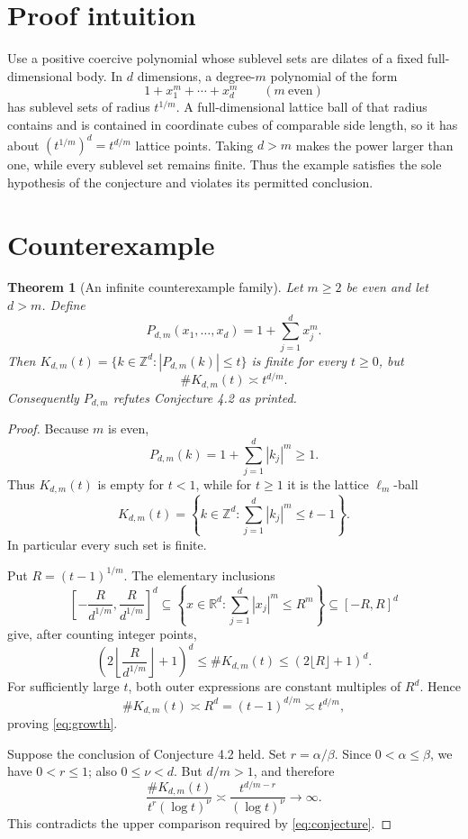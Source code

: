 \documentclass[11pt]{article}
\newtheorem{theorem}{Theorem}
\newcommand{\R}{\mathbb R}
\newcommand{\Z}{\mathbb Z}
\begin{document}
\section{Proof intuition}

Use a positive coercive polynomial whose sublevel sets are dilates of a
fixed full-dimensional body.  In $d$ dimensions, a degree-$m$ polynomial
of the form
\[
 1+x_1^m+\cdots+x_d^m\qquad(m\ \text{even})
\]
has sublevel sets of radius $t^{1/m}$.  A full-dimensional lattice ball of
that radius contains and is contained in coordinate cubes of comparable
side length, so it has about $(t^{1/m})^d=t^{d/m}$ lattice points.  Taking
$d>m$ makes the power larger than one, while every sublevel set remains
finite.  Thus the example satisfies the sole hypothesis of the conjecture
and violates its permitted conclusion.

\section{Counterexample}

\begin{theorem}[An infinite counterexample family]\label{thm:family}
Let $m\ge2$ be even and let $d>m$.  Define
\[
 P_{d,m}(x_1,\ldots,x_d)=1+\sum_{j=1}^d x_j^m.
\]
Then $K_{d,m}(t)=\{k\in\Z^d:|P_{d,m}(k)|\le t\}$ is finite for every
$t\ge0$, but
\begin{equation}\label{eq:growth}
 \#K_{d,m}(t)\asymp t^{d/m}.
\end{equation}
Consequently $P_{d,m}$ refutes Conjecture 4.2 as printed.
\end{theorem}

\begin{proof}
Because $m$ is even,
\[
 P_{d,m}(k)=1+\sum_{j=1}^d |k_j|^m\ge1.
\]
Thus $K_{d,m}(t)$ is empty for $t<1$, while for $t\ge1$ it is the
lattice $\ell_m$-ball
\begin{equation}\label{eq:ball}
 K_{d,m}(t)=\left\{k\in\Z^d:
       \sum_{j=1}^d|k_j|^m\le t-1\right\}.
\end{equation}
In particular every such set is finite.

Put $R=(t-1)^{1/m}$.  The elementary inclusions
\begin{equation}\label{eq:cubes}
 \left[-\frac{R}{d^{1/m}},\frac{R}{d^{1/m}}\right]^d
 \subseteq\left\{x\in\R^d:\sum_{j=1}^d|x_j|^m\le R^m\right\}
 \subseteq[-R,R]^d
\end{equation}
give, after counting integer points,
\[
 \left(2\left\lfloor\frac{R}{d^{1/m}}\right\rfloor+1\right)^d
 \le \#K_{d,m}(t)
 \le (2\lfloor R\rfloor+1)^d.
\]
For sufficiently large $t$, both outer expressions are constant multiples
of $R^d$.  Hence
\[
 \#K_{d,m}(t)\asymp R^d=(t-1)^{d/m}\asymp t^{d/m},
\]
proving \eqref{eq:growth}.

Suppose the conclusion of Conjecture 4.2 held.  Set
$r=\alpha/\beta$.  Since $0<\alpha\le\beta$, we have $0<r\le1$;
also $0\le\nu<d$.  But $d/m>1$, and therefore
\[
 \frac{\#K_{d,m}(t)}{t^r(\log t)^\nu}
 \asymp\frac{t^{d/m-r}}{(\log t)^\nu}\longrightarrow\infty.
\]
This contradicts the upper comparison required by
\eqref{eq:conjecture}.
\end{proof}
\end{document}
